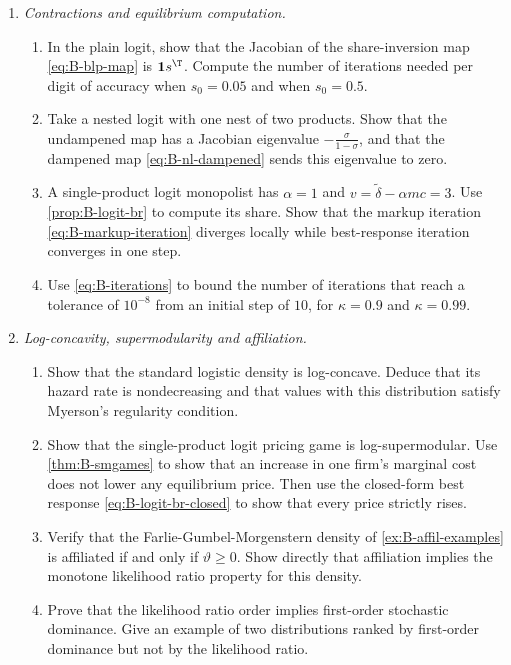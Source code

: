 \begin{enumerate}[label=\arabic*., leftmargin=*, itemsep=6pt]
\item \emph{Contractions and equilibrium computation.}
\begin{enumerate}[label=(\alph*)]
  \item In the plain logit, show that the Jacobian of the share-inversion map \eqref{eq:B-blp-map} is $\mathbf{1}s^\T$.
  Compute the number of iterations needed per digit of accuracy when $s_0 = 0.05$ and when $s_0 = 0.5$.
  \item Take a nested logit with one nest of two products. Show that the undampened map has a Jacobian eigenvalue
  $-\frac{\sigma}{1 - \sigma}$, and that the dampened map \eqref{eq:B-nl-dampened} sends this eigenvalue to zero.
  \item A single-product logit monopolist has $\alpha = 1$ and $v = \tilde\delta - \alpha mc = 3$. Use
  \cref{prop:B-logit-br} to compute its share. Show that the markup iteration \eqref{eq:B-markup-iteration} diverges
  locally while best-response iteration converges in one step.
  \item Use \eqref{eq:B-iterations} to bound the number of iterations that reach a tolerance of $10^{-8}$ from an
  initial step of $10$, for $\kappa = 0.9$ and $\kappa = 0.99$.
\end{enumerate}

\item \emph{Log-concavity, supermodularity and affiliation.}
\begin{enumerate}[label=(\alph*)]
  \item Show that the standard logistic density is log-concave. Deduce that its hazard rate is nondecreasing and
  that values with this distribution satisfy Myerson's regularity condition.
  \item Show that the single-product logit pricing game is log-supermodular. Use \cref{thm:B-smgames} to show that
  an increase in one firm's marginal cost does not lower any equilibrium price. Then use the closed-form best
  response \eqref{eq:B-logit-br-closed} to show that every price strictly rises.
  \item Verify that the Farlie-Gumbel-Morgenstern density of \cref{ex:B-affil-examples} is affiliated if and only if
  $\vartheta \geq 0$. Show directly that affiliation implies the monotone likelihood ratio property for this
  density.
  \item Prove that the likelihood ratio order implies first-order stochastic dominance. Give an example of two
  distributions ranked by first-order dominance but not by the likelihood ratio.
\end{enumerate}

\end{enumerate}
